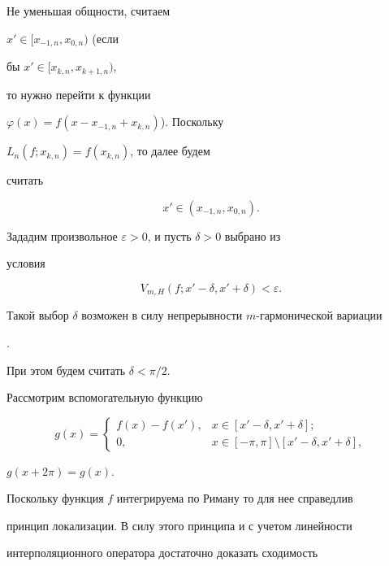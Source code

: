 \begin{pf} Не уменьшая общности, считаем


$x'\in[x_{-1,n},x_{0,n})$ (если


бы $x'\in[x_{k,n},x_{k+1,n})$,


то нужно перейти к функции


$\varphi(x)=f(x-x_{-1,n}+x_{k,n})$). Поскольку


$L_n(f;x_{k,n})=f(x_{k,n})$, то далее будем


считать


\begin{equation}


x'\in(x_{-1,n},x_{0,n}).


\end{equation}





Зададим произвольное $\varepsilon>0$, и пусть $\delta>0$ выбрано из


условия


\begin{equation}


V_{m,H}(f;x'-\delta,x'+\delta)<\varepsilon.


\end{equation}


Такой выбор $\delta$ возможен в силу непрерывности $m$-гармонической вариации


\cite{K3}.


При этом будем считать $\delta<\pi/2$.





Рассмотрим вспомогательную функцию


$$


g(x)=


\begin{cases}


f(x)-f(x'),& x\in[x'-\delta,x'+\delta];\\


0, & x\in[-\pi,\pi]\setminus[x'-\delta,x'+\delta],


\end{cases}


$$


$g(x+2\pi)=g(x)$.


Поскольку функция $f$ интегрируема по Риману то для нее справедлив


принцип локализации. В силу этого принципа и с учетом линейности


интерполяционного оператора достаточно доказать сходимость



\end{pf}
